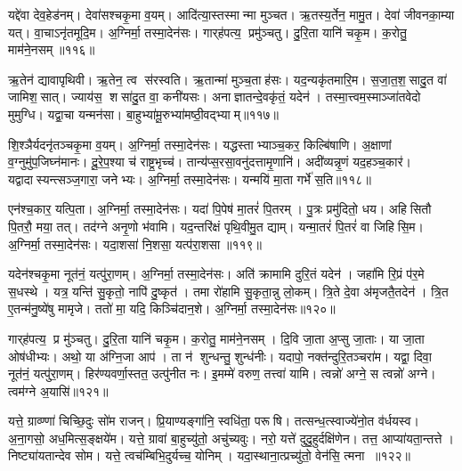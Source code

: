 यद्दे॑वा देव॒हेड॑नम्।
देवा॑सश्चकृ॒मा व॒यम्।
आदि॑त्या॒स्तस्मान्मा मुञ्चत।
ऋ॒तस्य॒र्तेन॒ मामु॒त।
देवा॑ जीवनका॒म्या यत्।
वा॒चाऽनृ॑तमूदि॒म।
अ॒ग्निर्मा॒ तस्मा॒देन॑सः।
गार्‌ह॑पत्य॒ प्रमु॑ञ्चतु।
दु॒रि॒ता यानि॑ चकृ॒म।
क॒रोतु॒ माम॑ने॒नसम्॥११६॥

ऋ॒तेन॑ द्यावापृथिवी।
ऋ॒तेन॒ त्व स॑रस्वति।
ऋ॒तान्मा॑ मुञ्च॒ताह॑सः।
यद॒न्यकृ॑तमारि॒म।
स॒जा॒त॒श॒सादु॒त वा॑ जामिश॒सात्।
ज्याय॑स॒ शसा॑दु॒त वा॒ कनी॑यसः।
अनाज्ञातन्दे॒वकृ॑तं॒ यदेन॑।
तस्मा॒त्त्वम॒स्माञ्जा॑तवेदो मुमुग्धि।
यद्वा॒चा यन्मन॑सा।
बा॒हुभ्या॑मू॒रुभ्या॑मष्ठी॒वद्भ्याम्॥११७॥

शि॒श्ञैर्यदनृ॑तञ्चकृ॒मा व॒यम्।
अ॒ग्निर्मा॒ तस्मा॒देन॑सः।
यद्धस्ताभ्याञ्च॒कर॒ किल्बि॑षाणि।
अ॒क्षाणां व॒ग्नुमु॑प॒जिघ्न॑मानः।
दू॒रे॒प॒श्या च॑ राष्ट्र॒भृच्च॑।
तान्य॑प्स॒रसा॒वनु॑दत्तामृ॒णानि॑।
अदी॑व्यन्नृ॒णं यद॒हञ्च॒कार॑।
यद्वादास्यन्त्सञ्ज॒गारा॒ जनेभ्यः।
अ॒ग्निर्मा॒ तस्मा॒देन॑सः।
यन्मयि॑ मा॒ता गर्भे॑ स॒ति॥११८॥

एन॑श्च॒कार॒ यत्पि॒ता।
अ॒ग्निर्मा॒ तस्मा॒देन॑सः।
यदा॑ पि॒पेष॑ मा॒तरं॑ पि॒तरम्।
पु॒त्रः प्रमु॑दितो॒ धय\sn{}।
अहिसितौ पि॒तरौ॒ मया॒ तत्।
तद॑ग्ने अनृ॒णो भ॑वामि।
यद॒न्तरि॑क्षं पृथि॒वीमु॒त द्याम्।
यन्मा॒तरं॑ पि॒तरं॑ वा जिहिसि॒म।
अ॒ग्निर्मा॒ तस्मा॒देन॑सः।
यदा॒शसा॑ नि॒शसा॒ यत्प॑रा॒शसा॥११९॥

यदेन॑श्चकृ॒मा नूत॑नं॒ यत्पु॑रा॒णम्।
अ॒ग्निर्मा॒ तस्मा॒देन॑सः।
अति॑ क्रामामि दुरि॒तं यदेन॑।
जहा॑मि रि॒प्रं प॑र॒मे स॒धस्थे।
यत्र॒ यन्ति॑ सु॒कृतो॒ नापि॑ दु॒ष्कृत॑।
तमा रो॑हामि सु॒कृता॒न्नु लो॒कम्।
त्रि॒ते दे॒वा अ॑मृजतै॒तदेन॑।
त्रि॒त ए॒तन्म॑नु॒ष्ये॑षु मामृजे।
ततो॑ मा॒ यदि॒ किञ्चि॑दान॒शे।
अ॒ग्निर्मा॒ तस्मा॒देन॑सः॥१२०॥

गार्‌ह॑पत्य॒ प्र मु॑ञ्चतु।
दु॒रि॒ता यानि॑ चकृ॒म।
क॒रोतु॒ माम॑ने॒नसम्।
दि॒वि जा॒ता अ॒प्सु जा॒ताः।
या जा॒ता ओष॑धीभ्यः।
अथो॒ या अ॑ग्नि॒जा आप॑।
ता न॑ शुन्धन्तु॒ शुन्ध॑नीः।
यदापो॒ नक्त॑न्दुरि॒तञ्चरा॑म।
यद्वा॒ दिवा॒ नूत॑नं॒ यत्पु॑रा॒णम्।
हिर॑ण्यवर्णा॒स्तत॒ उत्पु॑नीत नः।
इ॒मम्मे॑ वरुण॒ तत्त्वा॑ यामि।
त्वन्नो॑ अग्ने॒ स त्वन्नो॑ अग्ने।
त्वम॑ग्ने अ॒यासि॑॥१२१॥\anuvakamend[अ॒ने॒नस॑मष्ठी॒वद्भ्या स॒ति प॑रा॒शसा॑ऽऽन॒शेऽग्निर्मा॒ तस्मा॒देन॑सः पुनीत न॒स्त्रीणि॑ च (यद्दे॑वा॒ देवा॑ ऋ॒तेन॑ सजातश॒साद्यद्वा॒चा यद्धस्ताभ्या॒मदीव्यं॒ यन्मयि॑ मा॒ता यदा॑ पि॒पेष॒ यद॒न्तरि॑क्षं॒ यदा॒शसाऽति॑ क्रामामि त्रि॒ते दे॒वा दि॒वि जा॒ता अ॒प्सु जा॒ता यदाप॑ इ॒मम्मे॑ वरुण॒ तत्त्वा॑ यामि॒ त्वन्नो॑ अग्ने॒ स त्वन्नो॑ अग्ने॒ त्वम॑ग्ने अ॒यासि॑।
)]

यत्ते॒ ग्राव्ण्णा॑ चिच्छि॒दुः सो॑म राजन्।
प्रि॒याण्यङ्गा॑नि॒ स्वधि॑ता॒ परूषि।
तत्सन्ध॒त्स्वाज्ये॑नो॒त व॑र्धयस्व।
अ॒ना॒गसो॒ अध॒मित्स॒ङ्क्षये॑म।
यत्ते॒ ग्रावा॑ बा॒हुच्यु॑तो॒ अचु॑च्यवुः।
नरो॒ यत्ते॑ दुदु॒हुर्दक्षि॑णेन।
तत्त॒ आप्या॑यता॒न्तत्ते।
निष्ट्या॑यतान्देव सोम।
यत्ते॒ त्वच॑म्बिभि॒दुर्यच्च॒ योनिम्।
यदा॒स्थाना॒त्प्रच्यु॑तो॒ वेन॑सि॒ त्मना ॥१२२॥

